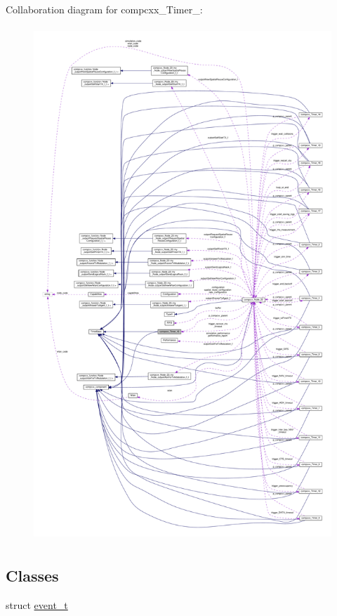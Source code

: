 Collaboration diagram for compcxx\+\_\+\+Timer\+\_\+:\nopagebreak
\begin{figure}[H]
\begin{center}
\leavevmode
\includegraphics[height=550pt]{classcompcxx__Timer__16__coll__graph}
\end{center}
\end{figure}
\subsection*{Classes}
\begin{DoxyCompactItemize}
\item 
struct \hyperlink{structcompcxx__Timer__16_1_1event__t}{event\+\_\+t}
\end{DoxyCompactItemize}
